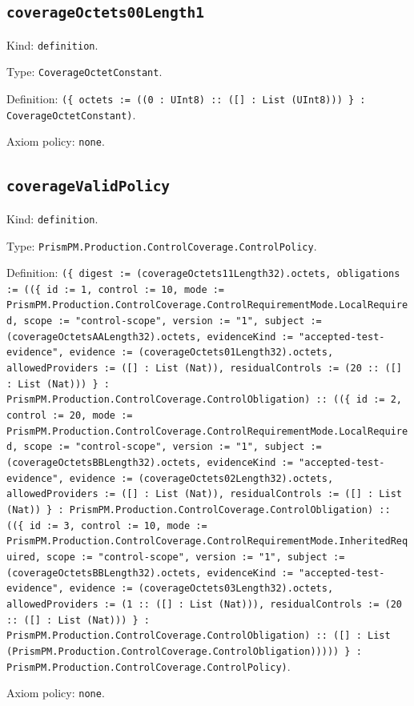 \documentclass[11pt]{article}
\begin{document}
\subsection*{\texttt{coverageOctets00Length1}}
\noindent Kind: \texttt{definition}.\par
\noindent Type: \texttt{CoverageOctetConstant}.\par
\noindent Definition: \texttt{(\{ octets := ((0 : UInt8) :: ([] : List (UInt8))) \} : CoverageOctetConstant)}.\par
\noindent Axiom policy: \texttt{none}.\par
\subsection*{\texttt{coverageValidPolicy}}
\noindent Kind: \texttt{definition}.\par
\noindent Type: \texttt{PrismPM.Production.ControlCoverage.ControlPolicy}.\par
\noindent Definition: \texttt{(\{ digest := (coverageOctets11Length32).octets, obligations := ((\{ id := 1, control := 10, mode := PrismPM.Production.ControlCoverage.ControlRequirementMode.LocalRequired, scope := "control-scope", version := "1", subject := (coverageOctetsAALength32).octets, evidenceKind := "accepted-test-evidence", evidence := (coverageOctets01Length32).octets, allowedProviders := ([] : List (Nat)), residualControls := (20 :: ([] : List (Nat))) \} : PrismPM.Production.ControlCoverage.ControlObligation) :: ((\{ id := 2, control := 20, mode := PrismPM.Production.ControlCoverage.ControlRequirementMode.LocalRequired, scope := "control-scope", version := "1", subject := (coverageOctetsBBLength32).octets, evidenceKind := "accepted-test-evidence", evidence := (coverageOctets02Length32).octets, allowedProviders := ([] : List (Nat)), residualControls := ([] : List (Nat)) \} : PrismPM.Production.ControlCoverage.ControlObligation) :: ((\{ id := 3, control := 10, mode := PrismPM.Production.ControlCoverage.ControlRequirementMode.InheritedRequired, scope := "control-scope", version := "1", subject := (coverageOctetsBBLength32).octets, evidenceKind := "accepted-test-evidence", evidence := (coverageOctets03Length32).octets, allowedProviders := (1 :: ([] : List (Nat))), residualControls := (20 :: ([] : List (Nat))) \} : PrismPM.Production.ControlCoverage.ControlObligation) :: ([] : List (PrismPM.Production.ControlCoverage.ControlObligation))))) \} : PrismPM.Production.ControlCoverage.ControlPolicy)}.\par
\noindent Axiom policy: \texttt{none}.\par
\end{document}
